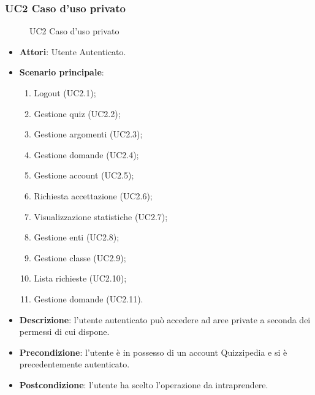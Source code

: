 \subsubsection{UC2 Caso d'uso privato}
\begin{figure}[H]
\centering
\noindent{}
\caption{UC2 Caso d'uso privato}
\end{figure}
\begin{itemize}
\item \textbf{Attori}: Utente Autenticato.
\item \textbf{Scenario principale}:
\begin{enumerate}
\item Logout (UC2.1);
\item Gestione quiz (UC2.2);
\item Gestione argomenti (UC2.3);
\item Gestione domande (UC2.4);
\item Gestione account (UC2.5);
\item Richiesta accettazione (UC2.6);
\item Visualizzazione statistiche (UC2.7);
\item Gestione enti (UC2.8);
\item Gestione classe (UC2.9);
\item Lista richieste (UC2.10);
\item Gestione domande (UC2.11).
\end{enumerate}
\item \textbf{Descrizione}: l'utente autenticato può accedere ad aree private a seconda dei permessi di cui dispone.
\item \textbf{Precondizione}: l'utente è in possesso di un account Quizzipedia e si è precedentemente autenticato.
\item \textbf{Postcondizione}: l'utente ha scelto l'operazione da intraprendere.
\end{itemize}
